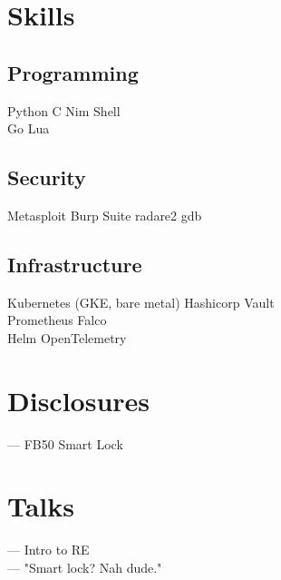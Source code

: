\documentclass[]{config}
\begin{document}
\begin{minipage}[t]{0.33\textwidth}
\section{Skills}
\subsection{Programming}
Python \textbullet{} C \textbullet{} Nim \textbullet{} Shell \\
\textbullet{} Go \textbullet{} Lua
\sectionsep
\subsection{Security}
Metasploit \textbullet{} Burp Suite \textbullet{}
radare2 \textbullet{} gdb
\sectionsep
\subsection{Infrastructure}
Kubernetes (GKE, bare metal) \textbullet{} Hashicorp Vault \\
\textbullet{} Prometheus  \textbullet{} Falco \\
\textbullet{} Helm \textbullet{} OpenTelemetry
\sectionsep


\section{Disclosures}
{\bf{}} — FB50 Smart Lock

\vspace{4mm} %
\section{Talks}
{\bf{}} — Intro to RE \\
{\bf{}} — "Smart lock? Nah dude."
%
%

\end{minipage} 
\hfill
\end{document}
